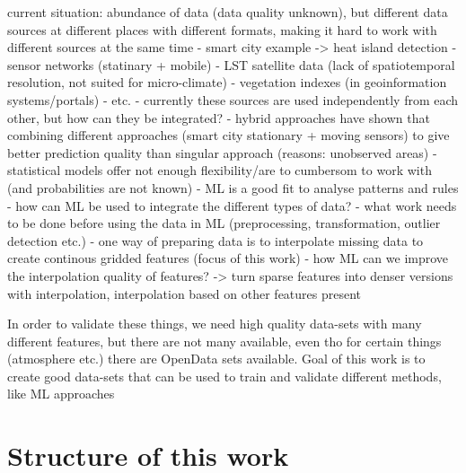current situation: abundance of data (data quality unknown), but different data sources at different places with different formats, making it hard to work with different sources at the same time
- smart city example -> heat island detection
    - sensor networks (statinary + mobile)
    - LST satellite data (lack of spatiotemporal resolution, not suited for micro-climate)
    - vegetation indexes (in geoinformation systems/portals)
    - etc.
- currently these sources are used independently from each other, but how can they be integrated?
    - hybrid approaches have shown that combining different approaches (smart city stationary + moving sensors) to give better prediction quality than singular approach (reasons: unobserved areas)
    - statistical models offer not enough flexibility/are to cumbersom to work with (and probabilities are not known)
    - ML is a good fit to analyse patterns and rules
- how can ML be used to integrate the different types of data?
- what work needs to be done before using the data in ML (preprocessing, transformation, outlier detection etc.)
    - one way of preparing data is to interpolate missing data to create continous gridded features (focus of this work)
    - how ML can we improve the interpolation quality of features? -> turn sparse features into denser versions with interpolation, interpolation based on other features present

In order to validate these things, we need high quality data-sets with many different features, but there are not many available, even tho for certain things (atmosphere etc.) there are OpenData sets available.
Goal of this work is to create good data-sets that can be used to train and validate different methods, like ML approaches

\section{Structure of this work}

